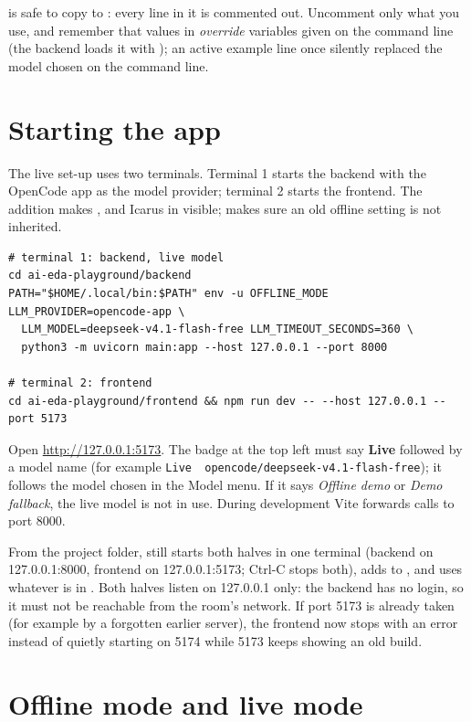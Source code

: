  is safe to copy to : every line in it is commented out. Uncomment only what you use, and remember that values in  \emph{override} variables given on the command line (the backend loads it with ); an active example line once silently replaced the model chosen on the command line.

\section{Starting the app}

The live set-up uses two terminals. Terminal 1 starts the backend with the OpenCode app as the model provider; terminal 2 starts the frontend. The  addition makes ,  and Icarus in  visible;  makes sure an old offline setting is not inherited.

\begin{lstlisting}[style=plain]
# terminal 1: backend, live model
cd ai-eda-playground/backend
PATH="$HOME/.local/bin:$PATH" env -u OFFLINE_MODE LLM_PROVIDER=opencode-app \
  LLM_MODEL=deepseek-v4.1-flash-free LLM_TIMEOUT_SECONDS=360 \
  python3 -m uvicorn main:app --host 127.0.0.1 --port 8000

# terminal 2: frontend
cd ai-eda-playground/frontend && npm run dev -- --host 127.0.0.1 --port 5173
\end{lstlisting}

Open \url{http://127.0.0.1:5173}. The badge at the top left must say \textbf{Live} followed by a model name (for example \texttt{Live \textbullet\ opencode/deepseek-v4.1-flash-free}); it follows the model chosen in the Model menu. If it says \emph{Offline demo} or \emph{Demo fallback}, the live model is not in use. During development Vite forwards  calls to port 8000.

From the project folder, \code{./run.sh} still starts both halves in one terminal (backend on 127.0.0.1:8000, frontend on 127.0.0.1:5173; Ctrl-C stops both), adds \file{~/.local/bin} to \code{PATH}, and uses whatever is in \file{backend/.env}. Both halves listen on 127.0.0.1 only: the backend has no login, so it must not be reachable from the room's network. If port 5173 is already taken (for example by a forgotten earlier server), the frontend now stops with an error instead of quietly starting on 5174 while 5173 keeps showing an old build.

\section{Offline mode and live mode}

